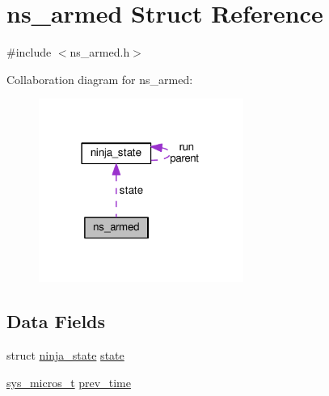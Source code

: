 \hypertarget{structns__armed}{\section{ns\+\_\+armed Struct Reference}
\label{structns__armed}
}


{\ttfamily \#include $<$ns\+\_\+armed.\+h$>$}



Collaboration diagram for ns\+\_\+armed\+:\nopagebreak
\begin{figure}[H]
\begin{center}
\leavevmode
\includegraphics[width=190pt]{structns__armed__coll__graph}
\end{center}
\end{figure}
\subsection*{Data Fields}
\begin{DoxyCompactItemize}
\item 
struct \hyperlink{structninja__state}{ninja\+\_\+state} \hyperlink{structns__armed_a916e16ef9375df6aff9e85431c8d27e0}{state}
\item 
\hyperlink{system__calls_8h_a1374d627d8a03b6d9ebb6707c67cf2ff}{sys\+\_\+micros\+\_\+t} \hyperlink{structns__armed_a39c662c8477d026a17a6b8b1f76b8754}{prev\+\_\+time}
\end{DoxyCompactItemize}


